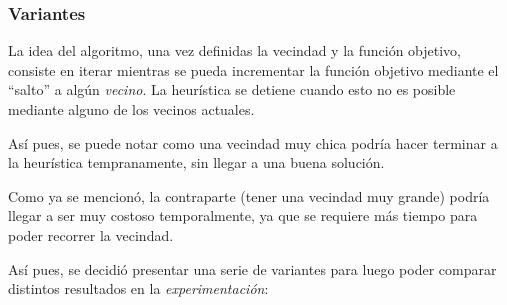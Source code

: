 \subsubsection{Variantes}\label{bl:variantes}
\par La idea del algoritmo, una vez definidas la vecindad y la funci\'on objetivo,
    consiste en iterar mientras se pueda incrementar la funci\'on objetivo mediante
    el ``salto'' a alg\'un \emph{vecino}. La heur\'istica se detiene cuando
    esto no es posible mediante alguno de los vecinos actuales.

\par As\'i pues, se puede notar como una vecindad muy chica podr\'ia hacer
    terminar a la heur\'istica tempranamente, sin llegar a una buena soluci\'on.

\par Como ya se mencion\'o, la contraparte (tener una vecindad muy grande) podr\'ia
    llegar a ser muy costoso temporalmente, ya que se requiere m\'as tiempo para
    poder recorrer la vecindad.

\par As\'i pues, se decidi\'o presentar una serie de variantes para luego poder
    comparar distintos resultados en la \emph{experimentaci\'on}:

